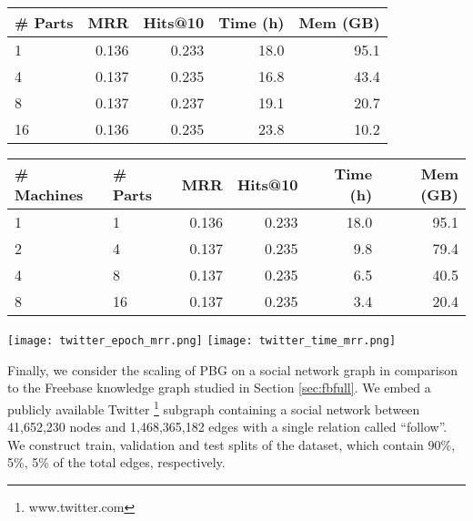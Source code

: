 \documentclass{article}
\begin{document}
\begin{table*}[t]
\centering
\small

\begin{tabular}{l r r r r}
\hline
\# Parts & MRR & Hits@10 & Time (h) & Mem (GB) \\\hline
1  & 0.136 & 0.233 & 18.0 & 95.1 \\
\hline
4  & 0.137 & 0.235 & 16.8 & 43.4 \\
8  & 0.137 & 0.237 & 19.1 & 20.7 \\
16 & 0.136 & 0.235 & 23.8 & 10.2 \\\hline 
\end{tabular}
\quad
\begin{tabular}{l l r r r r}
\hline
\# Machines &  \# Parts & MRR & Hits@10 & Time (h) &  Mem (GB) \\\hline
1  & 1 & 0.136 & 0.233 & 18.0 & 95.1 \\
\hline
2 & 4 & 0.137 & 0.235 & 9.8 & 79.4 \\
4 & 8 & 0.137 & 0.235 & 6.5 & 40.5 \\
8 & 16 & 0.137 & 0.235 & 3.4 & 20.4 \\\hline 
\end{tabular}
\caption{Model evaluation, training time (10 epochs) and peak memory usage for embeddings of the Twitter graph. \textbf{Left:} Training with different numbers of partitions on a single machine. \textbf{Right:} Distributed training on different numbers of machines. 
}
\label{tab:twitter}
\end{table*}

\begin{figure*}[h]
\centering
    \texttt{[image: twitter\_epoch\_mrr.png]}
    \texttt{[image: twitter\_time\_mrr.png]}
    \vspace{-3mm}
    \caption{Learning curve for PBG models on the Twitter dataset with different number of machines used in training. MRR of learned embeddings is plotted as a function of epoch (\textbf{top}) and wallclock time (\textbf{bottom}).}
    \vspace{-3mm}
    \label{fig:twitter}
\end{figure*}

Finally, we consider the scaling of PBG on a social network graph in comparison to the Freebase knowledge graph studied in Section \ref{sec:fbfull}. We embed a publicly available Twitter \footnote{www.twitter.com} subgraph \cite{kwak2010twitter} \cite{boldi2004webgraph} \cite{boldi2011layered} containing a social network between 41,652,230 nodes and 1,468,365,182 edges with a single relation called ``follow''. We construct train, validation and test splits of the dataset, which contain 90\%, 5\%, 5\% of the total edges, respectively.
\end{document}

